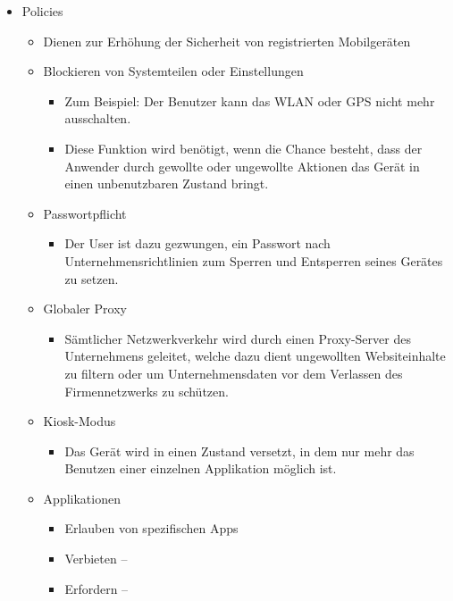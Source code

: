 \begin{itemize}
	\item Policies
	\begin{itemize}
		\item Dienen zur Erhöhung der Sicherheit von registrierten Mobilgeräten
		\item Blockieren von Systemteilen oder Einstellungen
		\begin{itemize}
			\item Zum Beispiel: Der Benutzer kann das WLAN oder GPS nicht mehr ausschalten.
			\item Diese Funktion wird benötigt, wenn die Chance besteht, dass der Anwender durch gewollte oder ungewollte Aktionen das Gerät in einen unbenutzbaren Zustand bringt.
		\end{itemize}
		\item Passwortpflicht
		\begin{itemize}
			\item Der User ist dazu gezwungen, ein Passwort nach Unternehmensrichtlinien zum Sperren und Entsperren seines Gerätes zu setzen.
		\end{itemize}
		\item Globaler Proxy
		\begin{itemize}
			\item Sämtlicher Netzwerkverkehr wird durch einen Proxy-Server des Unternehmens geleitet, welche dazu dient ungewollten Websiteinhalte zu filtern oder um Unternehmensdaten vor dem Verlassen des Firmennetzwerks zu schützen.
		\end{itemize}
		\item Kiosk-Modus
		\begin{itemize}
			\item Das Gerät wird in einen Zustand versetzt, in dem nur mehr das Benutzen einer einzelnen Applikation möglich ist.
		\end{itemize}
		\item Applikationen
		\begin{itemize}
			\item Erlauben von spezifischen Apps
			\item Verbieten –
			\item Erfordern –
		\end{itemize}
	\end{itemize}
\end{itemize}


